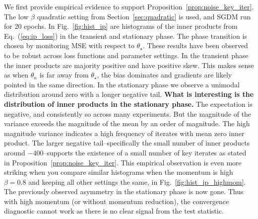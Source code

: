 \documentclass[conference]{IEEEtran}
\begin{document}
We first provide empirical evidence to support Proposition~\ref{prop:noise_key_iter}.  The low $\beta$ quadratic setting from Section~\ref{sec:quadratic} is used, and SGDM run for 20 epochs. In Fig.~\ref{fig:hist_ip} are histograms of the inner products from Eq.~(\ref{eq:ip_loss}) in the transient and stationary phase. The phase transition is chosen by monitoring MSE with respect to $\theta_\star$.
These results have been observed to be robust across loss functions and parameter settings.  In the transient phase the inner products are majority positive and have positive skew. 
This makes sense as when $\theta_n$ is far away from $\theta_\star$, the bias dominates and gradients are likely pointed in the same direction. In the stationary phase we observe a unimodal distribution around zero with a longer negative tail.
\textbf{What is interesting  is the distribution of inner products in the stationary phase.}
The expectation is  negative, and consistently so across many experiments. But the magnitude of the variance exceeds the magnitude of the mean by an order of magnitude. The  high magnitude variance indicates a high frequency of iterates with mean zero inner product.
The larger negative tail--specifically the small number of inner products around $-400$--supports the existence of a small number of key iterates as stated in Proposition~\ref{prop:noise_key_iter}.
This empirical observation is even more striking when you compare similar histograms when the momentum is high $\beta = 0.8$ and keeping all other settings the same, in Fig.~\ref{fig:hist_ip_highmom}.
The previously observed asymmetry in the stationary phase is now gone.
Thus with high momentum (or without momentum reduction), the convergence diagnostic cannot work as there is no clear signal from the test statistic.
\end{document}
